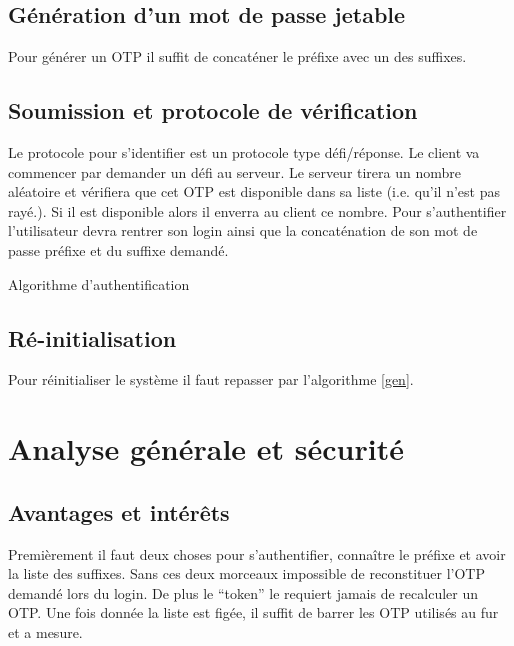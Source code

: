 \documentclass{../res/univ-projet}
\begin{document}
\subsection{Génération d'un mot de passe jetable}
    Pour générer un OTP il suffit de concaténer le préfixe avec un des suffixes.

\subsection{Soumission et protocole de vérification}
        Le protocole pour s'identifier est un protocole type défi/réponse. Le client
    va commencer par demander un défi au serveur. Le serveur tirera un nombre aléatoire
    et vérifiera que cet OTP est disponible dans sa liste (i.e. qu'il n'est pas rayé.).
    Si il est disponible alors il enverra au client ce nombre. Pour s'authentifier l'utilisateur
    devra rentrer son login ainsi que la concaténation de son mot de passe préfixe et du suffixe
    demandé.

    \begin{algorithm}
        \begin{algorithmic}
            \ELSE
            \ENDIF
        \end{algorithmic}
        \caption{Algorithme d'authentification}
    \end{algorithm}


\subsection{Ré-initialisation}
        Pour réinitialiser le système il faut repasser par l'algorithme \ref{gen}.

\section{Analyse générale et sécurité}
\subsection{Avantages et intérêts}
        Premièrement il faut deux choses pour s'authentifier, connaître le préfixe et avoir
    la liste des suffixes. Sans ces deux morceaux impossible de reconstituer l'OTP
    demandé lors du login. De plus le ``token'' le requiert jamais de recalculer un
    OTP. Une fois donnée la liste est figée, il suffit de barrer les OTP utilisés au
    fur et a mesure.
\end{document}
